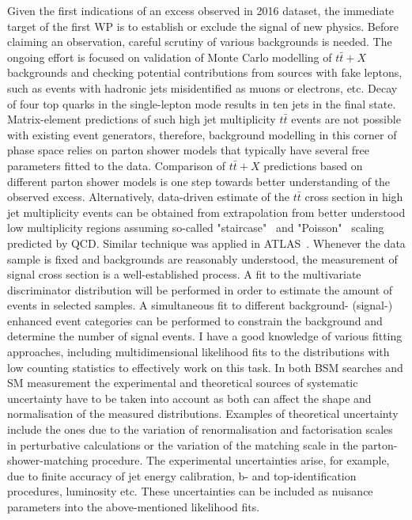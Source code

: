 \textcolor{\mynew}{
Given the first indications of an excess observed in 2016 dataset, the immediate target of the first WP is to establish or exclude the signal of new physics. Before claiming an observation, careful scrutiny of various backgrounds is needed. The ongoing effort is focused on validation of Monte Carlo modelling of $t\bar{t}+X$ backgrounds and checking potential contributions from sources with fake leptons, such as events with hadronic jets misidentified as muons or electrons, etc. 
}
\textcolor{\mynew}{
Decay of four top quarks in the single-lepton mode results in ten jets in the final state. Matrix-element predictions of such high jet multiplicity $t\bar{t}$ events are not possible with existing event generators, therefore, background modelling in this corner of phase space relies on parton shower models that typically have several free parameters fitted to the data. Comparison of $t\bar{t}+X$ predictions based on different parton shower models is one step towards better understanding of the observed excess. Alternatively, data-driven estimate of the $t\bar{t}$ cross section in high jet multiplicity events can be obtained from extrapolation from better understood low multiplicity regions assuming so-called "staircase"~\cite{Ellis:1985vn} and "Poisson"~\cite{Gerwick:2012hq} scaling predicted by QCD. Similar technique was applied in ATLAS~\cite{Aaboud:2017faq}.
}
\textcolor{\mynew}{
Whenever the data sample is fixed and backgrounds are reasonably understood, the measurement of signal cross section is a well-established process. A fit to the multivariate discriminator distribution will be performed in order to estimate the amount of \fourtop events in selected samples. A simultaneous fit to different background- (signal-) enhanced event categories can be performed to constrain the background and determine the number of signal events. I have a good knowledge of various fitting approaches, including multidimensional likelihood fits to the distributions with low counting statistics to effectively work on this task.
}
\textcolor{\mycolor}{
In both BSM searches and SM measurement the experimental and theoretical sources of systematic uncertainty have to be taken into account as both can affect the shape and normalisation of the measured distributions. Examples of theoretical uncertainty include the ones due to the variation of renormalisation and factorisation scales in perturbative calculations or the variation of the matching scale in the parton-shower-matching procedure. The experimental uncertainties arise, for example, due to finite accuracy of jet energy calibration, b- and top-identification procedures, luminosity etc. These uncertainties can be included as nuisance parameters into the above-mentioned likelihood fits.
}
